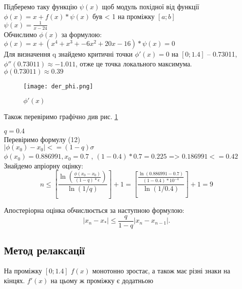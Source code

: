\documentclass[a4paper, 12pt]{article}
\begin{document}
Підберемо таку функцію $\psi(x)$ щоб модуль похідної від функції $\phi(x) = x + f(x)* \psi(x)$ був < 1 на проміжку $[a;b]$ \\[0.25ex]
$\psi(x) =  \frac{1}{x - 24}$ \\
Обчислимо $\phi(x)$ за формулою: \\
$\phi(x) = x + (x^4 + x^3 + -6x^2 + 20x - 16) * \psi(x)= 0$ \\[0.25ex]


Для визначення q знайдемо критичні точки $\phi'(x) = 0$  на $[0 ; 1.4]$ -- 0.73011,  \\
$\phi''(0.73011) \approx -1.011$, отже це точка локального максимума.  \\
$\phi(0.73011) \approx 0.39 $ \\


\begin{figure}[h]
	\centering
	\texttt{[image: der\_phi.png]}
	\caption{$\phi'(x)$}
	\label{fig:der_phi}
\end{figure}

Також перевіримо графічно див рис. \ref{fig:der_phi}

$q = 0.4 $ \\

Перевіримо формулу (12) \\

$|\phi(x_{0}) -x_{0}| <= (1-q)\sigma$ \\[0.25ex]

$\phi(x_{0}) = 0.886991, x_{0} = 0.7$ , $(1-0.4)*0.7 = 0.225$ => $0.186991 <= 0.42$ \\[0.25ex]

Знайдемо апріорну оцінку: \\
\[

	n \leq \left[ \frac{\ln\left( \frac{\phi(x_0 - x_0)}{(1-q) * \epsilon} \right)}{\ln(1/q)} \right] + 1 =
	\left[ \frac{\frac{\ln(0.886991 - 0.7)}{(1-0.4) * 10^{-4}}}{\ln(1/0.4)} \right] + 1 = 9
\]

Апостеріорна оцінка обчислюється за наступною формулою:
\[
	\left| x_n - x_* \right| \leq \frac{q}{1 - q} \left| x_n - x_{n-1} \right|.
\]
\newpage

\subsection{Метод релаксації}
На проміжку $[0; 1.4]$ $f(x)$ монотонно зростає, а також має різні знаки на кінцях. $f'(x)$ на цьому ж проміжку є додатньою
\\[0.25ex]
\end{document}

